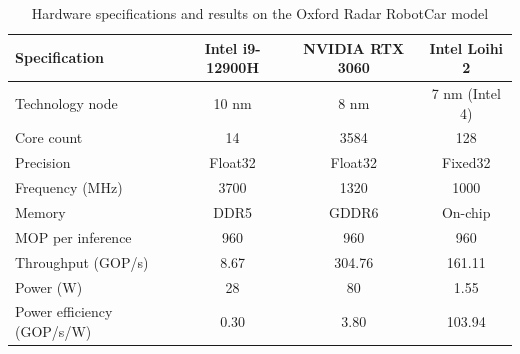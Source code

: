 \documentclass[12pt,a4paper,final]{extreport}
\begin{document}
{\renewcommand{\arraystretch}{1.12}
\begin{table}[htbp]
\centering
\caption{Hardware specifications and results on the Oxford Radar RobotCar model \cite{p2}}\label{tab:p2_hw}
\small
\begin{tabular}{|l|c|c|c|}
\hline
\textbf{Specification} & \textbf{Intel i9-12900H} & \textbf{NVIDIA RTX 3060} & \textbf{Intel Loihi 2} \\ \hline
Technology node & 10 nm & 8 nm & 7 nm (Intel 4) \\ \hline
Core count & 14 & 3584 & 128 \\ \hline
Precision & Float32 & Float32 & Fixed32 \\ \hline
Frequency (MHz) & 3700 & 1320 & 1000 \\ \hline
Memory & DDR5 & GDDR6 & On-chip \\ \hline
MOP per inference & 960 & 960 & 960 \\ \hline
Throughput (GOP/s) & 8.67 & 304.76 & 161.11 \\ \hline
Power (W) & 28 & 80 & 1.55 \\ \hline
Power efficiency (GOP/s/W) & 0.30 & 3.80 & 103.94 \\ \hline
\end{tabular}
\end{table}}
\end{document}
